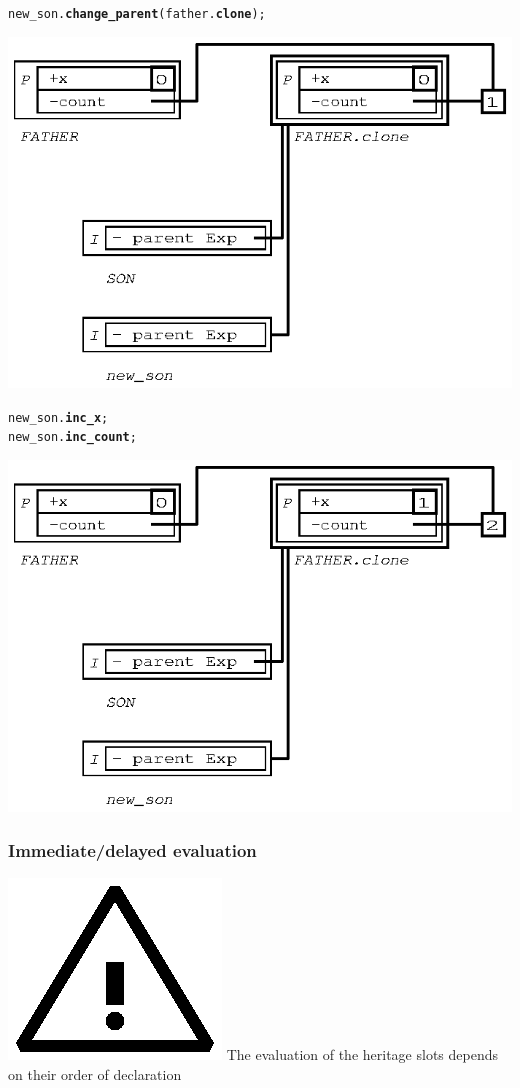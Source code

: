 \documentclass[11pt]{mybook}
\newcommand{\warning}{\includegraphics[scale=0.3]{figures/warning}}
\begin{document}
\begin{alltt}
  new\_son.{\bf{}change\_parent} ({\sc{}father}.{\bf{}clone});
\end{alltt}
\begin{center}
\includegraphics[scale=1.0]{figures/inherit_expanded_minus_3} 
\end{center}

\begin{alltt}
  new\_son.{\bf{}inc\_x};
  new\_son.{\bf{}inc\_count};
\end{alltt}
\begin{center}
\includegraphics[scale=1.0]{figures/inherit_expanded_minus_4} 
\end{center}
\subsubsection{Immediate/delayed evaluation}
\label{language_reference:section_identifiers:inherit_section:parent_evaluation}
%
\warning{} The evaluation of the heritage slots depends on their
order of declaration
\end{document}
